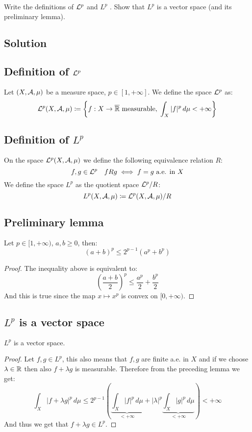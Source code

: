 
\question
Write the definitions of $\mathcal{L}^p$ and $L^p$ . Show that $L^p$ is a vector space (and its preliminary lemma).

\subsection*{Solution}

\subsection{Definition of \texorpdfstring{$\mathcal{L}^p$}{Lp}}
Let $(X,\mathcal{A}, \mu)$ be a measure space, $p\in[1,+\infty]$. We define the space $\mathcal{L}^p$ as:
\[ \mathcal{L}^p(X,\mathcal{A}, \mu) \coloneqq \left\{ f:X\to\overline{\mathbb{R}} \text{ measurable}, \; \int_X |f|^p \, d\mu < +\infty \right\} \]

\subsection{Definition of \texorpdfstring{$L^p$}{Lp}}
On the space $\mathcal{L}^p(X,\mathcal{A}, \mu)$ we define the following equivalence relation $R$:
\[ f,g\in\mathcal{L}^p \quad f R g \iff f=g \text{ a.e. in } X \]
We define the space $L^p$ as the quotient space $\mathcal{L}^p/R$:
\[ L^p(X,\mathcal{A}, \mu) \coloneqq \mathcal{L}^p(X,\mathcal{A}, \mu)/R \]

\subsection{Preliminary lemma}
Let $p\in[1,+\infty)$, $a,b \geq 0$, then:
\[ (a+b)^p \leq 2^{p-1} (a^p + b^p) \]
 
\begin{proof}
    The inequality above is equivalent to:
    \[ \left( \frac{a+b}{2} \right)^p \leq \frac{a^p}{2} + \frac{b^p}{2} \]
    And this is true since the map $x \mapsto x^p$ is convex on $[0,+\infty)$.
\end{proof}

\subsection{\texorpdfstring{$L^p$}{Lp} is a vector space}
$L^p$ is a vector space.

\begin{proof}
Let $f,g \in L^p$, this also means that $f,g$ are finite a.e. in $X$ and if we choose $\lambda\in\mathbb{R}$ then also $f+\lambda g$ is measurable. Therefore from the preceding lemma we get:
\[ \int_X |f+\lambda g|^p \, d\mu \leq 2^{p-1} \left( \underbrace{\int_X |f|^p \, d\mu}_{<+\infty} + |\lambda|^p \underbrace{\int_X |g|^p \, d\mu}_{<+\infty} \right) < +\infty \]
And thus we get that $f+\lambda g \in L^p$.
\end{proof}

